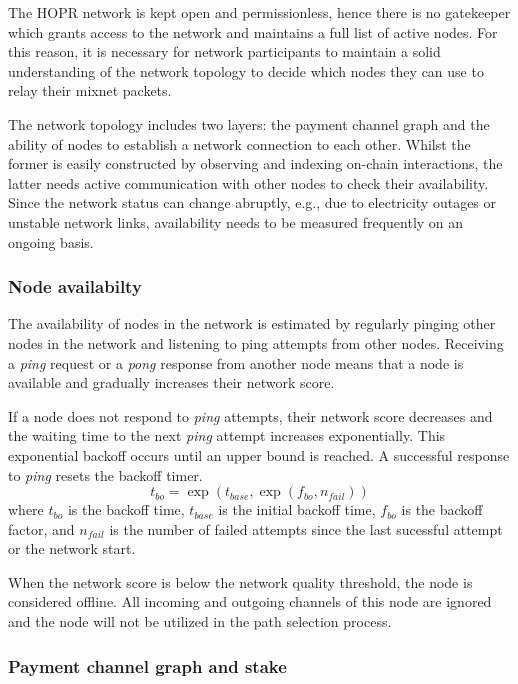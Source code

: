 The HOPR network is kept open and permissionless, hence there is no gatekeeper which grants access to the network and maintains a full list of active nodes. For this reason, it is necessary for network participants to maintain a solid understanding of the network topology to decide which nodes they can use to relay their mixnet packets.

The network topology includes two layers: the payment channel graph and the ability of nodes to establish a network connection to each other. Whilst the former is easily constructed by observing and indexing on-chain interactions, the latter needs active communication with other nodes to check their availability. Since the network status can change abruptly, e.g., due to electricity outages or unstable network links, availability needs to be measured frequently on an ongoing basis.

\subsubsection{Node availabilty}

The availability of nodes in the network is estimated by regularly pinging other nodes in the network and listening to ping attempts from other nodes. Receiving a \textit{ping} request or a \textit{pong} response from another node means that a node is available and gradually increases their network score.

If a node does not respond to \textit{ping} attempts, their network score decreases and the waiting time to the next \textit{ping} attempt increases exponentially. This exponential backoff occurs until an upper bound is reached. A successful response to \textit{ping} resets the backoff timer.
$$t_{bo} = \exp (t_{base}, {\exp (f_{bo}, n_{fail})})$$
where $t_{bo}$ is the backoff time, $t_{base}$ is the initial backoff time, $f_{bo}$ is the backoff factor, and $ n_{fail}$ is the number of failed attempts since the last sucessful attempt or the network start.

When the network score is below the network quality threshold, the node is considered offline. All incoming and outgoing channels of this node are ignored and the node will not be utilized in the path selection process.

\subsubsection{Payment channel graph and stake}

